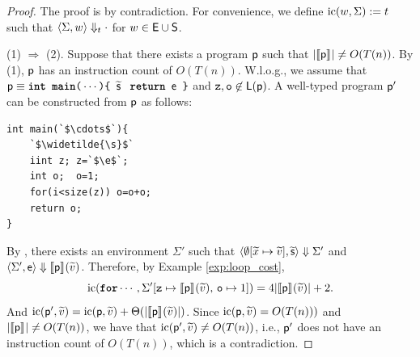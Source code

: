 \documentclass[runningheads]{llncs}
\begin{document}
\begin{proof}
The proof is by contradiction.
For convenience, we define $\mathrm{ic}(w, \Sigma):=t$ such that $\langle\Sigma,w\rangle\Downarrow_{t}{\cdot}$ for $w\in\mathsf{E}\cup\mathsf{S}$.

\vspace*{1mm}
\noindent
(1) $\Rightarrow$ (2).\quad
Suppose that there exists a program $\mathsf{p}$ such that $\vert\llbracket\mathsf{p}\rrbracket_{}\vert\neq O(T(n))$. By (1), $\mathsf{p}$ has an instruction count of $O(T(n))$.
W.l.o.g., we assume that $\mathsf{p}\equiv \texttt{\textbf{int main}(}\cdots\texttt{)\{ }\widetilde{\mathsf{s}}\;\texttt{ \textbf{return} }\mathsf{e}\texttt{ \}}$ and $\texttt{z},\texttt{o}\not\in\mathsf{L}(\mathsf{p})$.
A well-typed program $\mathsf{p}'$ can be constructed from $\mathsf{p}$ as follows:
\begin{lstlisting}
int main(`$\cdots$`){
    `$\widetilde{\s}$`
    iint z; z=`$\e$`;
    int o;  o=1;
    for(i<size(z)) o=o+o;
    return o;
}
\end{lstlisting}
By , there exists an environment $\Sigma'$ such that $\langle\emptyset[\widetilde{x}\mapsto\widetilde{v}],\widetilde{\mathsf{s}}\rangle\Downarrow{\Sigma'}$ and $\langle\Sigma',\mathsf{e}\rangle\Downarrow{\llbracket\mathsf{p}\rrbracket_{}(\widetilde{v})}$.
Therefore, by Example \ref{exp:loop_cost},
$$\ic(\texttt{\textbf{for}}\cdots,\Sigma'[\texttt{z}\mapsto \smap{\p}{}(\widetilde{v}),\,\texttt{o}\mapsto1])=4\size{\smap{\p}{}(\widetilde{v})}+2.\vspace{2mm}$$
And $\mathrm{ic}(\mathsf{p}', \widetilde{v})=\mathrm{ic}(\mathsf{p},\widetilde{v})+\Theta(\vert\llbracket\mathsf{p}\rrbracket_{}(\widetilde{v})\vert)$.
Since $\mathrm{ic}(\mathsf{p},\widetilde{v})=O(T(n)))$ and $\vert\llbracket\mathsf{p}\rrbracket_{}\vert\neq O(T(n))$, we have that $\mathrm{ic}(\mathsf{p}',\widetilde{v})\neq O(T(n))$, i.e., $\mathsf{p}'$ does not have an instruction count of $O(T(n))$, which is a contradiction.


\end{proof}
\end{document}
